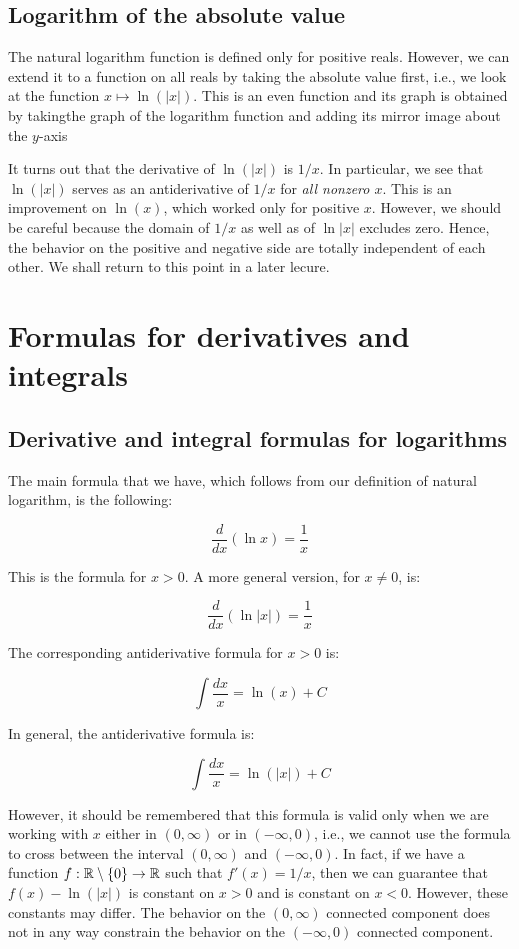 \documentclass[10pt]{amsart}
\begin{document}
\subsection{Logarithm of the absolute value}

The natural logarithm function is defined only for positive
reals. However, we can extend it to a function on all reals by taking
the absolute value first, i.e., we look at the function $x \mapsto
\ln(|x|)$. This is an even function and its graph is obtained by
takingthe graph of the logarithm function and adding its mirror image
about the $y$-axis

It turns out that the derivative of $\ln(|x|)$ is $1/x$. In
particular, we see that $\ln(|x|)$ serves as an antiderivative of
$1/x$ for {\em all nonzero $x$}. This is an improvement on $\ln(x)$,
which worked only for positive $x$. However, we should be careful
because the domain of $1/x$ as well as of $\ln|x|$ excludes
zero. Hence, the behavior on the positive and negative side are
totally independent of each other. We shall return to this point in a
later lecure.

\section{Formulas for derivatives and integrals}

\subsection{Derivative and integral formulas for logarithms}

The main formula that we have, which follows from our definition of
natural logarithm, is the following:

$$\frac{d}{dx} (\ln x) = \frac{1}{x}$$

This is the formula for $x > 0$. A more general version, for $x \ne
0$, is:

$$\frac{d}{dx} (\ln |x|) = \frac{1}{x}$$

The corresponding antiderivative formula for $x > 0$ is:

$$\int \frac{dx}{x} = \ln(x) + C$$

In general, the antiderivative formula is:

$$\int \frac{dx}{x} = \ln(|x|) + C$$

However, it should be remembered that this formula is valid only when
we are working with $x$ either in $(0,\infty)$ or in $(-\infty,0)$,
i.e., we cannot use the formula to cross between the interval
$(0,\infty)$ and $(-\infty,0)$. In fact, if we have a function $f: \mathbb{R}
\setminus \{ 0 \} \to \mathbb{R}$ such that $f'(x) = 1/x$, then we can
guarantee that $f(x) - \ln(|x|)$ is constant on $x > 0$ and is
constant on $x < 0$. However, these constants may differ. The behavior
on the $(0,\infty)$ connected component does not in any way constrain
the behavior on the $(-\infty,0)$ connected component.
\end{document}
